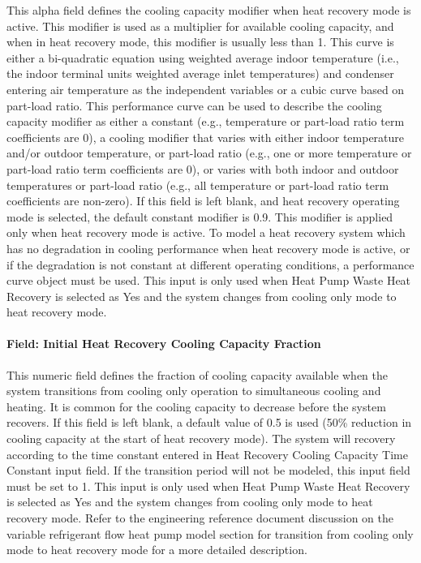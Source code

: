 This alpha field defines the cooling capacity modifier when heat recovery mode is active. This modifier is used as a multiplier for available cooling capacity, and when in heat recovery mode, this modifier is usually less than 1. This curve is either a bi-quadratic equation using weighted average indoor temperature (i.e., the indoor terminal units weighted average inlet temperatures) and condenser entering air temperature as the independent variables or a cubic curve based on part-load ratio. This performance curve can be used to describe the cooling capacity modifier as either a constant (e.g., temperature or part-load ratio term coefficients are 0), a cooling modifier that varies with either indoor temperature and/or outdoor temperature, or part-load ratio (e.g., one or more temperature or part-load ratio term coefficients are 0), or varies with both indoor and outdoor temperatures or part-load ratio (e.g., all temperature or part-load ratio term coefficients are non-zero). If this field is left blank, and heat recovery operating mode is selected, the default constant modifier is 0.9. This modifier is applied only when heat recovery mode is active. To model a heat recovery system which has no degradation in cooling performance when heat recovery mode is active, or if the degradation is not constant at different operating conditions, a performance curve object must be used. This input is only used when Heat Pump Waste Heat Recovery is selected as Yes and the system changes from cooling only mode to heat recovery mode.

\paragraph{Field: Initial Heat Recovery Cooling Capacity Fraction}\label{field-initial-heat-recovery-cooling-capacity-fraction}

This numeric field defines the fraction of cooling capacity available when the system transitions from cooling only operation to simultaneous cooling and heating. It is common for the cooling capacity to decrease before the system recovers. If this field is left blank, a default value of 0.5 is used (50\% reduction in cooling capacity at the start of heat recovery mode). The system will recovery according to the time constant entered in Heat Recovery Cooling Capacity Time Constant input field. If the transition period will not be modeled, this input field must be set to 1. This input is only used when Heat Pump Waste Heat Recovery is selected as Yes and the system changes from cooling only mode to heat recovery mode. Refer to the engineering reference document discussion on the variable refrigerant flow heat pump model section for transition from cooling only mode to heat recovery mode for a more detailed description.

